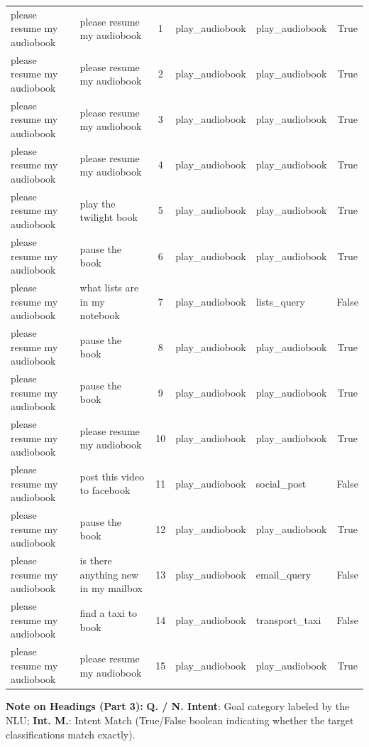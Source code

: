 {\begin{longtable}{p{3.8cm} p{3.8cm} c ll c}
\midrule
please resume my audiobook & please resume my audiobook & 1 & play\_audiobook & play\_audiobook & True \\
please resume my audiobook & please resume my audiobook & 2 & play\_audiobook & play\_audiobook & True \\
please resume my audiobook & please resume my audiobook & 3 & play\_audiobook & play\_audiobook & True \\
please resume my audiobook & please resume my audiobook & 4 & play\_audiobook & play\_audiobook & True \\
please resume my audiobook & play the twilight book & 5 & play\_audiobook & play\_audiobook & True \\
please resume my audiobook & pause the book & 6 & play\_audiobook & play\_audiobook & True \\
please resume my audiobook & what lists are in my notebook & 7 & play\_audiobook & lists\_query & False \\
please resume my audiobook & pause the book & 8 & play\_audiobook & play\_audiobook & True \\
please resume my audiobook & pause the book & 9 & play\_audiobook & play\_audiobook & True \\
please resume my audiobook & please resume my audiobook & 10 & play\_audiobook & play\_audiobook & True \\
please resume my audiobook & post this video to facebook & 11 & play\_audiobook & social\_post & False \\
please resume my audiobook & pause the book & 12 & play\_audiobook & play\_audiobook & True \\
please resume my audiobook & is there anything new in my mailbox & 13 & play\_audiobook & email\_query & False \\
please resume my audiobook & find a taxi to book & 14 & play\_audiobook & transport\_taxi & False \\
please resume my audiobook & please resume my audiobook & 15 & play\_audiobook & play\_audiobook & True \\
\bottomrule
\end{longtable}
}
\vspace{0.1cm}
{\footnotesize\noindent\raggedright \textbf{Note on Headings (Part 3):} \textbf{Q. / N. Intent}: Goal category labeled by the NLU; \textbf{Int. M.}: Intent Match (True/False boolean indicating whether the target classifications match exactly).\par}

